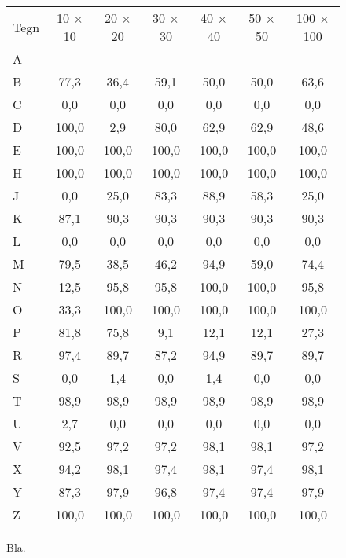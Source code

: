 \begin{figure}[htp]
\centering
\begin{tabular}{|l|c|c|c|c|c|c|}\hline
\rowcolor[gray]{0.9} \multicolumn{7}{|>{\columncolor[gray]{0.9}}c|}{\textbf{Forenings-billeder}} \\ \hline
Tegn & 10 $\times$ 10 & 20 $\times$ 20 & 30 $\times$ 30 & 40 $\times$ 40 & 50 $\times$ 50 & 100 $\times$ 100\\\hline
A & - & - & - & - & - & -\\\hline
B & 77,3 & 36,4 & 59,1 & 50,0 & 50,0 & 63,6\\\hline
C & 0,0 & 0,0 & 0,0 & 0,0 & 0,0 & 0,0\\\hline
D & 100,0 & 2,9 & 80,0 & 62,9 & 62,9 & 48,6\\\hline
E & 100,0 & 100,0 & 100,0 & 100,0 & 100,0 & 100,0\\\hline
H & 100,0 & 100,0 & 100,0 & 100,0 & 100,0 & 100,0\\\hline
J & 0,0 & 25,0 & 83,3 & 88,9 & 58,3 & 25,0\\\hline
K & 87,1 & 90,3 & 90,3 & 90,3 & 90,3 & 90,3\\\hline
L & 0,0 & 0,0 & 0,0 & 0,0 & 0,0 & 0,0\\\hline
M & 79,5 & 38,5 & 46,2 & 94,9 & 59,0 & 74,4\\\hline
N & 12,5 & 95,8 & 95,8 & 100,0 & 100,0 & 95,8\\\hline
O & 33,3 & 100,0 & 100,0 & 100,0 & 100,0 & 100,0\\\hline
P & 81,8 & 75,8 & 9,1 & 12,1 & 12,1 & 27,3\\\hline
R & 97,4 & 89,7 & 87,2 & 94,9 & 89,7 & 89,7\\\hline
S & 0,0 & 1,4 & 0,0 & 1,4 & 0,0 & 0,0\\\hline
T & 98,9 & 98,9 & 98,9 & 98,9 & 98,9 & 98,9\\\hline
U & 2,7 & 0,0 & 0,0 & 0,0 & 0,0 & 0,0\\\hline
V & 92,5 & 97,2 & 97,2 & 98,1 & 98,1 & 97,2\\\hline
X & 94,2 & 98,1 & 97,4 & 98,1 & 97,4 & 98,1\\\hline
Y & 87,3 & 97,9 & 96,8 & 97,4 & 97,4 & 97,9\\\hline
Z & 100,0 & 100,0 & 100,0 & 100,0 & 100,0 & 100,0\\\hline
\end{tabular}
\caption{Bla.}
\label{fig:test:and_bogstav}
\end{figure}

